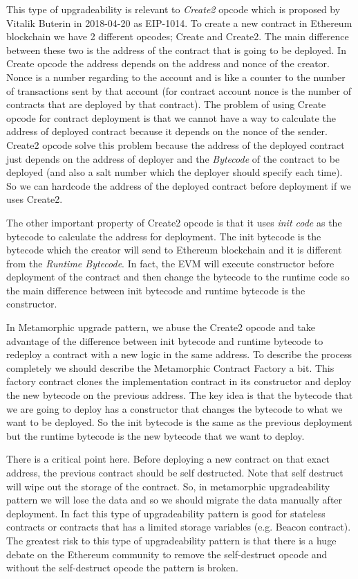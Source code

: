 This type of upgradeability is relevant to \textit{Create2} opcode which is proposed by Vitalik Buterin in 2018-04-20 as EIP-1014. To create a new contract in Ethereum blockchain we have 2 different opcodes; Create and Create2. The main difference between these two is the address of the contract that is going to be deployed. In Create opcode the address depends on the address and nonce of the creator. Nonce is a number regarding to the account and is like a counter to the number of transactions sent by that account (for contract account nonce is the number of contracts that are deployed by that contract). The problem of using Create opcode for contract deployment is that we cannot have a way to calculate the address of deployed contract because it depends on the nonce of the sender. Create2 opcode solve this problem because the address of the deployed contract just depends on the address of deployer and the \textit{Bytecode} of the contract to be deployed (and also a salt number which the deployer should specify each time). So we can hardcode the address of the deployed contract before deployment if we uses Create2.

The other important property of Create2 opcode is that it uses \textit{init code} as the bytecode to calculate the address for deployment. The init bytecode is the bytecode which the creator will send to Ethereum blockchain and it is different from the \textit{Runtime Bytecode}. In fact, the EVM will execute constructor before deployment of the contract and then change the bytecode to the runtime code so the main difference between init bytecode and runtime bytecode is the constructor.

In Metamorphic upgrade pattern, we abuse the Create2 opcode and take advantage of the difference between init bytecode and runtime bytecode to redeploy a contract with a new logic in the same address. To describe the process completely we should describe the Metamorphic Contract Factory a bit. This factory contract clones the implementation contract in its constructor and deploy the new bytecode on the previous address. The key idea is that the bytecode that we are going to deploy has a constructor that changes the bytecode to what we want to be deployed. So the init bytecode is the same as the previous deployment but the runtime bytecode is the new bytecode that we want to deploy.

There is a critical point here. Before deploying a new contract on that exact address, the previous contract should be self destructed. Note that self destruct will wipe out the storage of the contract. So, in metamorphic upgradeability pattern we will lose the data and so we should migrate the data manually after deployment. In fact this type of upgradeability pattern is good for stateless contracts or contracts that has a limited storage variables (e.g. Beacon contract). The greatest risk to this type of upgradeability pattern is that there is a huge debate on the Ethereum community to remove the self-destruct opcode and without the self-destruct opcode the pattern is broken. 

